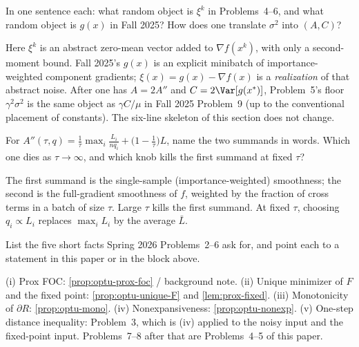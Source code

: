 \begin{exercise}
\label{ex:optu-xi-vs-g}
In one sentence each: what random object is $\xi^k$ in Problems~4--6, and what random object is $g(x)$ in Fall 2025? How does one translate $\sigma^2$ into $(A,C)$?
\end{exercise}

\begin{solution}
Here $\xi^k$ is an abstract zero-mean vector added to $\nabla f(x^k)$, with only a second-moment bound. Fall 2025's $g(x)$ is an explicit minibatch of importance-weighted component gradients; $\xi(x)=g(x)-\nabla f(x)$ is a \emph{realization} of that abstract noise. After one has $A=2A''$ and $C=2\Var[g(x^*)]$, Problem~5's floor $\gamma^2\sigma^2$ is the same object as $\gamma C/\mu$ in Fall 2025 Problem~9 (up to the conventional placement of constants). The six-line skeleton of this section does not change.
\end{solution}

\begin{exercise}
\label{ex:optu-name-A}
For $A''(\tau,q)=\frac1\tau\max_i\frac{L_i}{n q_i}+\bigl(1-\frac1\tau\bigr)L$, name the two summands in words. Which one dies as $\tau\to\infty$, and which knob kills the first summand at fixed $\tau$?
\end{exercise}

\begin{solution}
The first summand is the single-sample (importance-weighted) smoothness; the second is the full-gradient smoothness of $f$, weighted by the fraction of cross terms in a batch of size $\tau$. Large $\tau$ kills the first summand. At fixed $\tau$, choosing $q_i\propto L_i$ replaces $\max_i L_i$ by the average $\bar L$.
\end{solution}

\begin{exercise}
\label{ex:optu-2026-chain}
List the five short facts Spring 2026 Problems~2--6 ask for, and point each to a statement in this paper or in the block above.
\end{exercise}

\begin{solution}
(i) Prox FOC: \cref{prop:optu-prox-foc} / background note. (ii) Unique minimizer of $F$ and the fixed point: \cref{prop:optu-unique-F} and \cref{lem:prox-fixed}. (iii) Monotonicity of $\partial R$: \cref{prop:optu-mono}. (iv) Nonexpansiveness: \cref{prop:optu-nonexp}. (v) One-step distance inequality: Problem~3, which is (iv) applied to the noisy input and the fixed-point input. Problems~7--8 after that are Problems~4--5 of this paper.
\end{solution}

